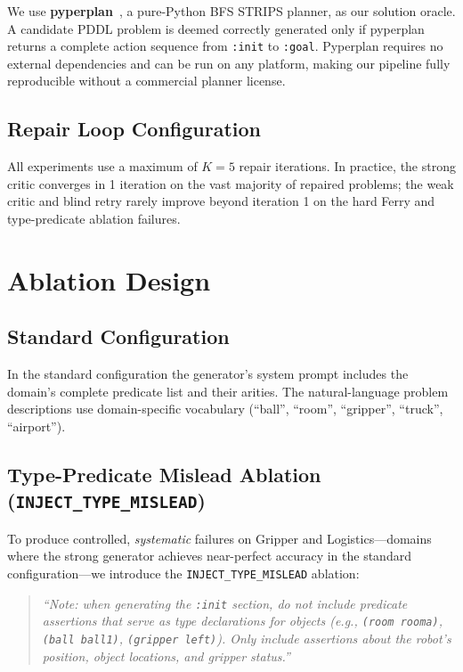 \documentclass{article}
\begin{document}
We use \textbf{pyperplan}~\cite{alkhazraji2020pyperplan}, a pure-Python BFS STRIPS
planner, as our solution oracle.  A candidate PDDL problem is deemed correctly
generated only if pyperplan returns a complete action sequence from \texttt{:init} to
\texttt{:goal}.  Pyperplan requires no external dependencies and can be run on any
platform, making our pipeline fully reproducible without a commercial planner license.

\subsection{Repair Loop Configuration}
\label{sec:config}

All experiments use a maximum of $K=5$ repair iterations.  In practice, the strong
critic converges in 1 iteration on the vast majority of repaired problems; the weak
critic and blind retry rarely improve beyond iteration 1 on the hard Ferry and
type-predicate ablation failures.

\section{Ablation Design}
\label{sec:ablation}

\subsection{Standard Configuration}
\label{sec:std_config}

In the standard configuration the generator's system prompt includes the domain's
complete predicate list and their arities.  The natural-language problem descriptions
use domain-specific vocabulary (``ball'', ``room'', ``gripper'', ``truck'',
``airport'').

\subsection{Type-Predicate Mislead Ablation (\texttt{INJECT\_TYPE\_MISLEAD})}
\label{sec:mislead}

To produce controlled, \emph{systematic} failures on Gripper and Logistics---domains
where the strong generator achieves near-perfect accuracy in the standard
configuration---we introduce the \texttt{INJECT\_TYPE\_MISLEAD} ablation:

\begin{quote}
\textit{``Note: when generating the \texttt{:init} section, do not include predicate
assertions that serve as type declarations for objects (e.g., \texttt{(room rooma)},
\texttt{(ball ball1)}, \texttt{(gripper left)}).  Only include assertions about the
robot's position, object locations, and gripper status.''}
\end{quote}
\end{document}
